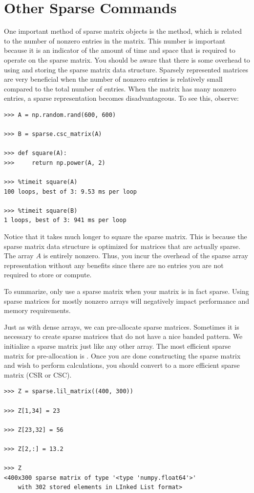 \section*{Other Sparse Commands}
One important method of sparse matrix objects is the  method, which is related to the number of nonzero entries in the matrix. This number is important because it is an indicator of the amount of time and space that is required to operate on the sparse matrix.
You should be aware that there is some overhead to using and storing the sparse matrix data structure. Sparsely represented matrices are very beneficial when the number of nonzero entries is relatively small compared to the total number of entries.
When the matrix has many nonzero entries, a sparse representation becomes disadvantageous.
To see this, observe: 

\begin{lstlisting}
>>> A = np.random.rand(600, 600)

>>> B = sparse.csc_matrix(A)

>>> def square(A):
>>>     return np.power(A, 2)

>>> %timeit square(A)
100 loops, best of 3: 9.53 ms per loop

>>> %timeit square(B)
1 loops, best of 3: 941 ms per loop
\end{lstlisting}

Notice that it takes much longer to square the sparse matrix.
This is because the sparse matrix data structure is optimized for matrices that are actually sparse. The array $A$ is entirely nonzero. Thus, you incur the overhead of the sparse array representation without any benefits since there are no entries you are not required to store or compute.

To summarize, only use a sparse matrix when your matrix is in fact sparse. Using sparse matrices for mostly nonzero arrays will negatively impact performance and memory requirements.

Just as with dense arrays, we can pre-allocate sparse matrices.
Sometimes it is necessary to create sparse matrices that do not have a nice banded pattern. We initialize a sparse matrix just like any other array. The most efficient sparse matrix for pre-allocation is . Once you are done constructing the sparse matrix and wish to perform calculations, you should convert to a more efficient sparse matrix (CSR or CSC).


\begin{lstlisting}
>>> Z = sparse.lil_matrix((400, 300))

>>> Z[1,34] = 23

>>> Z[23,32] = 56

>>> Z[2,:] = 13.2

>>> Z
<400x300 sparse matrix of type '<type 'numpy.float64'>'
	with 302 stored elements in LInked List format>

\end{lstlisting}

